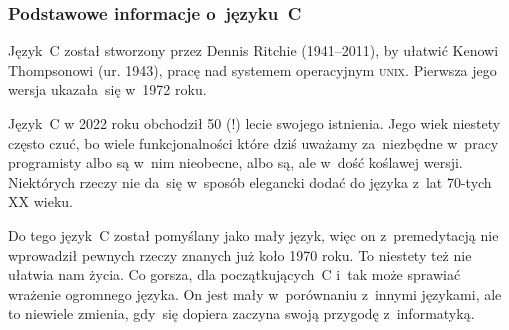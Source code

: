 \documentclass[10pt,t]{beamer}
\begin{document}
\begin{frame}
  \frametitle{Podstawowe informacje o~języku~C}


  Język~C został stworzony przez Dennis Ritchie (1941--2011), by ułatwić
  Kenowi Thompsonowi (ur. 1943), pracę nad systemem operacyjnym
  \textsc{unix}. Pierwsza jego wersja ukazała~się w~1972 roku.

  Język~C w 2022 roku obchodził 50 (!) lecie swojego istnienia. Jego wiek
  niestety często czuć, bo wiele funkcjonalności które dziś uważamy
  za~niezbędne w~pracy programisty albo są w~nim nieobecne, albo są,
  ale w~dość koślawej wersji. Niektórych rzeczy nie da~się w~sposób
  elegancki dodać do języka z~lat 70-tych XX wieku.

  Do tego język~C został pomyślany jako mały język, więc on z~premedytacją
  \alert{nie} wprowadził pewnych rzeczy znanych już koło 1970 roku. To
  niestety też nie ułatwia nam życia. Co gorsza, dla początkujących~C i~tak
  może sprawiać wrażenie ogromnego języka. On jest mały w~porównaniu
  z~innymi językami, ale to niewiele zmienia, gdy~się dopiera zaczyna swoją
  przygodę z~informatyką.

\end{frame}
\end{document}
